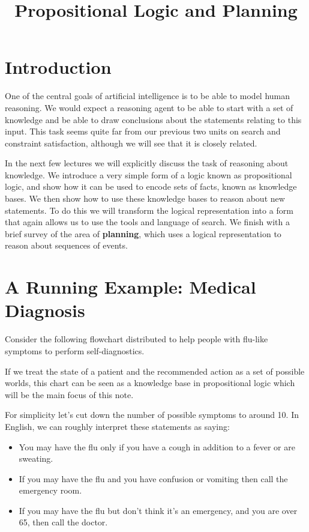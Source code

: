 \documentclass[11pt]{article}
\title{Propositional Logic and Planning}
\date{}
\begin{document}
\MakeScribeTop{}
\tableofcontents

\section{Introduction}

One of the central goals of artificial intelligence is to be able to
model human reasoning. We would expect a reasoning agent to be able to
start with a set of knowledge and be able to draw conclusions about
the statements relating to this input. This task seems quite far from
our previous two units on search and constraint satisfaction, although we will see that it is closely related.

In the next few lectures  we will explicitly discuss the task of reasoning about knowledge. We
introduce a very simple form of a logic known as propositional logic,
and show how it can be used to encode sets of facts, known
as knowledge bases. We then show how to use these knowledge bases to
reason about new statements. To do this we will transform the logical
representation into a form that again allows us to use the tools and
language of search. We finish with a brief survey of the area of
\textbf{planning}, which uses a logical representation to reason about
sequences of events.

\section{A Running Example: Medical Diagnosis}

Consider the following flowchart distributed to help people with flu-like symptoms to perform self-diagnostics. 



\noindent If we treat the state of a patient and the recommended action as a set of possible worlds, this chart can be seen as a knowledge base in propositional logic which will be the main focus of this note.  

For simplicity let's cut down the number of possible symptoms to around 10.  
In English, we can roughly interpret these statements as saying:

\begin{itemize}
\item  You may have the flu only if you have a cough in addition to a fever or are sweating. 
\item  If you may have the flu and you have confusion or vomiting then call the emergency room.
\item  If you may have the flu but don't think it's an emergency, and you are over 65, then call the doctor.
\end{itemize}
\end{document}
